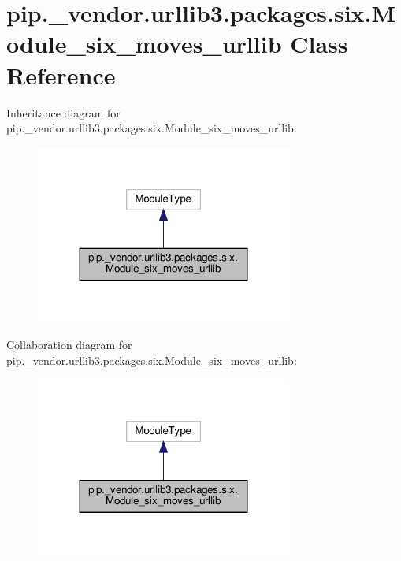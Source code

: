 \hypertarget{classpip_1_1__vendor_1_1urllib3_1_1packages_1_1six_1_1Module__six__moves__urllib}{}\section{pip.\+\_\+vendor.\+urllib3.\+packages.\+six.\+Module\+\_\+six\+\_\+moves\+\_\+urllib Class Reference}
\label{classpip_1_1__vendor_1_1urllib3_1_1packages_1_1six_1_1Module__six__moves__urllib}


Inheritance diagram for pip.\+\_\+vendor.\+urllib3.\+packages.\+six.\+Module\+\_\+six\+\_\+moves\+\_\+urllib\+:
\nopagebreak
\begin{figure}[H]
\begin{center}
\leavevmode
\includegraphics[width=239pt]{classpip_1_1__vendor_1_1urllib3_1_1packages_1_1six_1_1Module__six__moves__urllib__inherit__graph}
\end{center}
\end{figure}


Collaboration diagram for pip.\+\_\+vendor.\+urllib3.\+packages.\+six.\+Module\+\_\+six\+\_\+moves\+\_\+urllib\+:
\nopagebreak
\begin{figure}[H]
\begin{center}
\leavevmode
\includegraphics[width=239pt]{classpip_1_1__vendor_1_1urllib3_1_1packages_1_1six_1_1Module__six__moves__urllib__coll__graph}
\end{center}
\end{figure}
